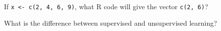 \documentclass[12pt,addpoints,answers]{exam}%
\newcommand{\code}[1]{\texttt{#1}}
\begin{document}
\runningfooter{}{}{}
\begin{center}
\end{center}






\begin{questions}

\question If \code{x <- c(2, 4, 6, 9)}, what R code will give the vector \code{c(2, 6)}?

\vspace{1in}

\question What is the difference between supervised and unsupervised learning?


















\end{questions}
\end{document}
